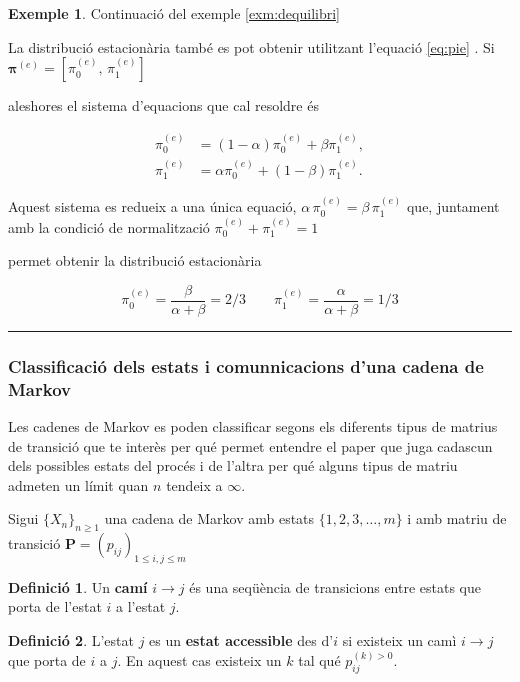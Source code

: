 \documentclass[
  catalan,
]{article}
\theoremstyle{definition}
\newtheorem{definition}{Definició}[section]
\theoremstyle{definition}
\newtheorem{example}{Exemple}[section]
\theoremstyle{definition}
\theoremstyle{definition}
\theoremstyle{remark}
\begin{document}
\begin{example}
Continuació del exemple \ref{exm:dequilibri}

La distribució estacionària també es pot obtenir utilitzant l'equació \eqref{eq:pie} . Si \(\boldsymbol{\pi}^{(e)}=\left[\pi^{(e)}_0,\,\pi^{(e)}_1\right]\)

aleshores el sistema d'equacions que cal resoldre és

\[
\begin{aligned}
\pi^{(e)}_0 &= (1-\alpha)\pi^{(e)}_0+\beta\pi^{(e)}_1,\\
\pi^{(e)}_1 &= \alpha\pi^{(e)}_0+(1-\beta)\pi^{(e)}_1.
\end{aligned}
\]

Aquest sistema es redueix a una única equació, \(\alpha\,\pi^{(e)}_0=\beta\,\pi^{(e)}_1\) que, juntament amb la condició de normalització \(\pi^{(e)}_0+\pi^{(e)}_1=1\)

permet obtenir la distribució estacionària

\[
\pi^{(e)}_0=\frac{\beta}{\alpha+\beta}=2/3
\qquad
\pi^{(e)}_1=\frac{\alpha}{\alpha+\beta}=1/3
\]
\end{example}

\begin{center}\rule{0.5\linewidth}{0.5pt}\end{center}

\subsubsection{Classificació dels estats i comunnicacions d'una cadena de Markov}\label{classificaciuxf3-dels-estats-i-comunnicacions-duna-cadena-de-markov}

Les cadenes de Markov es poden classificar segons els diferents tipus de matrius de transició que te interès per qué permet entendre el paper que juga cadascun dels possibles estats del procés i de l'altra per qué alguns tipus de matriu admeten un límit quan \(n\) tendeix a \(\infty\).

Sigui \(\{X_n\}_{n\geq 1}\) una cadena de Markov amb estats \(\{1,2,3,\dots,m\}\) i amb matriu de transició \(\boldsymbol{P}= (p_{ij})_{1\leq i,j\leq m}\)

\begin{definition}
Un \textbf{camí} \(i \rightarrow j\) és una seqüència de transicions entre estats que porta de l'estat \(i\) a l'estat \(j\).
\end{definition}

\begin{definition}
L'estat \(j\) es un \textbf{estat accessible} des d'\(i\) si existeix un camì \(i \rightarrow j\) que porta de \(i\) a \(j\). En aquest cas existeix un \(k\) tal qué \(p_{ij}^{(k)>0}\).
\end{definition}
\end{document}
